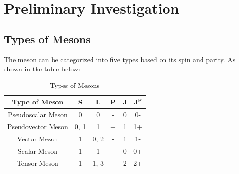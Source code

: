 \graphicspath{{Images/}}

\section{Preliminary Investigation}

\subsection{Types of Mesons}
The meson can be categorized into five types based on its spin and parity. As shown in the table below:

\begin{table}[htbp]
    \centering
    \caption{Types of Mesons}
    \vspace{4mm}
    \begin{tabular}{c | c c c c c}
        \hline \hline
        \textbf{Type of Meson} & \textbf{S} & \textbf{L} & \textbf{P} & \textbf{J} & \textbf{J$^{\textbf{P}}$} \\
        \hline
        Pseudoscalar Meson & 0 & 0 & - & 0 & 0- \\
        \hline
        Pseudovector Meson & 0, 1 & 1 & + & 1 & 1+ \\
        \hline
        Vector Meson & 1 & 0, 2 & - & 1 & 1- \\
        \hline
        Scalar Meson & 1 & 1 & + & 0 & 0+ \\
        \hline
        Tensor Meson & 1 & 1, 3 & + & 2 & 2+ \\
        \hline\hline
    \end{tabular}
    \label{tab:mesons}
\end{table}


